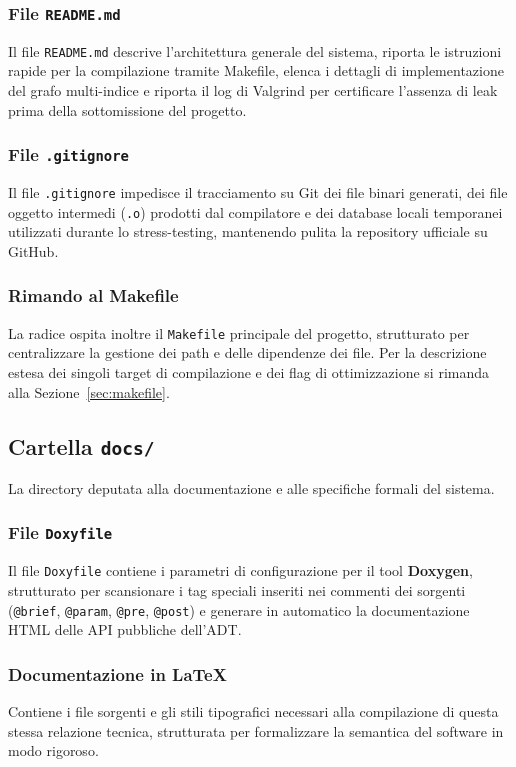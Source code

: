 \documentclass[12pt, a4paper]{article}
\begin{document}
\subsubsection{File \texttt{README.md}}
Il file \texttt{README.md} descrive l'architettura generale del sistema, riporta le istruzioni rapide per la compilazione tramite Makefile, elenca i dettagli di implementazione del grafo multi-indice e riporta il log di Valgrind per certificare l'assenza di leak prima della sottomissione del progetto.

\subsubsection{File \texttt{.gitignore}}
Il file \texttt{.gitignore} impedisce il tracciamento su Git dei file binari generati, dei file oggetto intermedi (\texttt{.o}) prodotti dal compilatore e dei database locali temporanei utilizzati durante lo stress-testing, mantenendo pulita la repository ufficiale su GitHub.

\subsubsection{Rimando al Makefile}
La radice ospita inoltre il \texttt{Makefile} principale del progetto, strutturato per centralizzare la gestione dei path e delle dipendenze dei file. Per la descrizione estesa dei singoli target di compilazione e dei flag di ottimizzazione si rimanda alla Sezione~\ref{sec:makefile}.

\subsection{Cartella \texttt{docs/}}
La directory deputata alla documentazione e alle specifiche formali del sistema.

\subsubsection{File \texttt{Doxyfile}}
Il file \texttt{Doxyfile} contiene i parametri di configurazione per il tool \textbf{Doxygen}, strutturato per scansionare i tag speciali inseriti nei commenti dei sorgenti (\texttt{@brief}, \texttt{@param}, \texttt{@pre}, \texttt{@post}) e generare in automatico la documentazione HTML delle API pubbliche dell'ADT.

\subsubsection{Documentazione in \LaTeX}
Contiene i file sorgenti e gli stili tipografici necessari alla compilazione di questa stessa relazione tecnica, strutturata per formalizzare la semantica del software in modo rigoroso.
\end{document}
